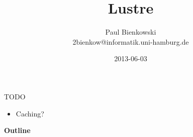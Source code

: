 \documentclass[compress,t,xcolor=dvipsnames]{beamer}
\title{Lustre}
\author{Paul Bienkowski \\[0.2em] \scriptsize 2bienkow@informatik.uni-hamburg.de}
\institute{Proseminar ``Ein-/Ausgabe - Stand der Wissenschaft''}
\date{2013-06-03}
\newif\iffinal
\begin{document}
\iffinal\else
\begin{frame}{TODO}
    \begin{itemize}
        \item Caching?
    \end{itemize}
\end{frame}
\fi

\begin{frame}
    \titlepage
\end{frame}

\begin{frame}{\textbf{Outline}}
    \tableofcontents
\end{frame}









\end{document}
